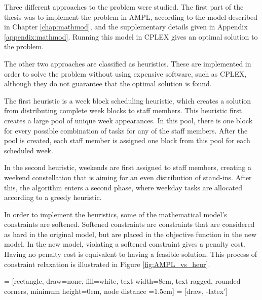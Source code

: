 Three different approaches to the problem were studied. The first part of the thesis was to implement the problem in AMPL, according to the model described in Chapter \ref{chap:mathmod}, and the supplementary details given in Appendix \ref{appendix:mathmod}. Running this model in CPLEX gives an optimal solution to the problem.

The other two approaches are classified as heuristics. These are implemented in order to solve the problem without using expensive software, such as CPLEX, although they do not guarantee that the optimal solution is found. 

The first heuristic is a week block scheduling heuristic, which creates a solution from distributing complete week blocks to staff members. This heuristic first creates a large pool of unique week appearances. In this pool, there is one block for every possible combination of tasks for any of the staff members. After the pool is created, each staff member is assigned one block from this pool for each scheduled week.

In the second heuristic, weekends are first assigned to staff members, creating a weekend constellation that is aiming for an even distribution of stand-ins. After this, the algorithm enters a second phase, where weekday tasks are allocated according to a greedy heuristic.

In order to implement the heuristics, some of the mathematical model's constraints are softened. Softened constraints are constraints that are considered as hard in the original model, but are placed in the objective function in the new model. In the new model, violating a softened constraint gives a penalty cost. Having no penalty cost is equivalent to having a feasible solution. This process of constraint relaxation is illustrated in Figure \ref{fig:AMPL_vs_heur}. 

 = [rectangle, draw=none, fill=white,
    text width=8em, text ragged, rounded corners, minimum height=0em, node distance =1.5cm]
 = [draw, -latex']
    
\newcommand*{\h}{\hspace{18pt}}%
\newcommand*{\hh}{\hspace{24pt}}%

